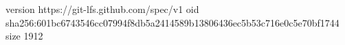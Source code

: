 version https://git-lfs.github.com/spec/v1
oid sha256:601bc6743546cc07994f8db5a2414589b13806436ec5b53c716e0c5e70bf1744
size 1912
